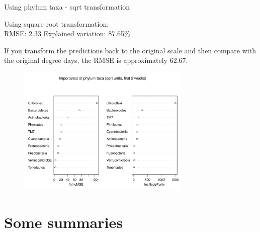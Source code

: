 \documentclass{beamer}
\begin{document}
\begin{frame}{Using phylum taxa - sqrt transformation}
  
  {\scriptsize
    
  \noindent Using square root transformation:\\
  RMSE: 2.33 \hspace{0.05in}  Explained variation: 87.65\%

  \vspace{0.05in}
  
  \noindent If you transform the predictions back to the original
  scale and then compare with the original degree days, the RMSE is
  approximately 62.67.
  
\begin{center}
\begin{figure}
  \includegraphics[width=3.25in]{../only_phyla/first_two_weeks/sqrt_units_first_two_weeks_phyla_imp_plot}
\end{figure}
\end{center}
\vspace{-0.25in}
}
  
\end{frame}





\section{Some summaries}
\end{document}
